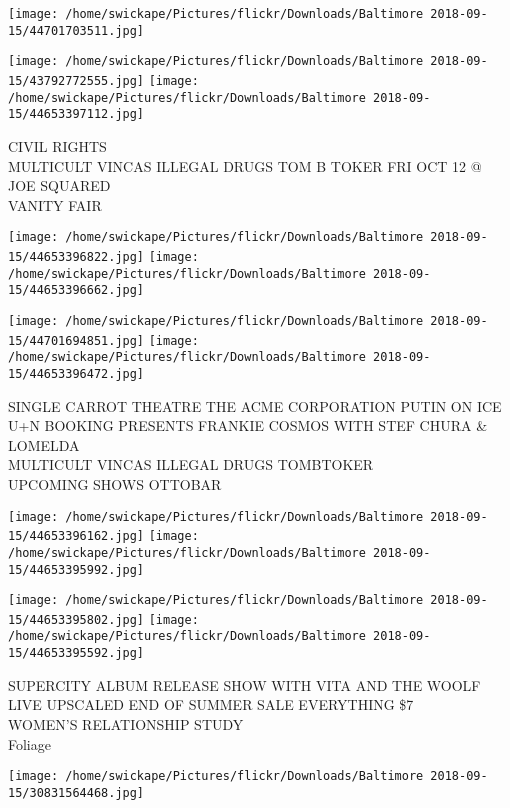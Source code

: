 \documentclass[10pt,letterpaper]{article}
\begin{document}
\texttt{[image: /home/swickape/Pictures/flickr/Downloads/Baltimore 2018-09-15/44701703511.jpg]}

\vspace{0.25in}
\texttt{[image: /home/swickape/Pictures/flickr/Downloads/Baltimore 2018-09-15/43792772555.jpg]}
\texttt{[image: /home/swickape/Pictures/flickr/Downloads/Baltimore 2018-09-15/44653397112.jpg]}

CIVIL RIGHTS\\
MULTICULT VINCAS ILLEGAL DRUGS TOM B TOKER FRI OCT 12 @ JOE SQUARED\\
VANITY FAIR\\
\pagebreak

\texttt{[image: /home/swickape/Pictures/flickr/Downloads/Baltimore 2018-09-15/44653396822.jpg]}
\texttt{[image: /home/swickape/Pictures/flickr/Downloads/Baltimore 2018-09-15/44653396662.jpg]}

\texttt{[image: /home/swickape/Pictures/flickr/Downloads/Baltimore 2018-09-15/44701694851.jpg]}
\texttt{[image: /home/swickape/Pictures/flickr/Downloads/Baltimore 2018-09-15/44653396472.jpg]}

SINGLE CARROT THEATRE THE ACME CORPORATION PUTIN ON ICE\\
U+N BOOKING PRESENTS FRANKIE COSMOS WITH STEF CHURA \& LOMELDA\\
MULTICULT VINCAS ILLEGAL DRUGS TOMBTOKER\\
UPCOMING SHOWS OTTOBAR\\
\pagebreak

\texttt{[image: /home/swickape/Pictures/flickr/Downloads/Baltimore 2018-09-15/44653396162.jpg]}
\texttt{[image: /home/swickape/Pictures/flickr/Downloads/Baltimore 2018-09-15/44653395992.jpg]}

\texttt{[image: /home/swickape/Pictures/flickr/Downloads/Baltimore 2018-09-15/44653395802.jpg]}
\texttt{[image: /home/swickape/Pictures/flickr/Downloads/Baltimore 2018-09-15/44653395592.jpg]}

SUPERCITY ALBUM RELEASE SHOW WITH VITA AND THE WOOLF\\
LIVE UPSCALED END OF SUMMER SALE EVERYTHING \$7\\
WOMEN'S RELATIONSHIP STUDY\\
Foliage\\
\pagebreak

\texttt{[image: /home/swickape/Pictures/flickr/Downloads/Baltimore 2018-09-15/30831564468.jpg]}
\end{document}

